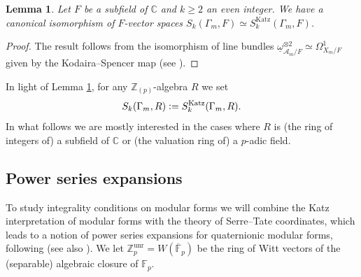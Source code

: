 \documentclass[a4paper,11pt]{amsart}
\numberwithin{equation}{section}
\theoremstyle{plain}
\newtheorem{lemma}[theorem]{Lemma}
\theoremstyle{definition}
\theoremstyle{remark}
\newcommand{\Z}{\mathbb{Z}}
\newcommand{\C}{\mathbb{C}}
\newcommand{\F}{\mathbb{F}}
\newcommand{\defeq}{\vcentcolon=}
\newcommand{\unr}{\mathrm{unr}}
\newcommand{\Katz}{\mathrm{Katz}}
\begin{document}
{\begin{lemma}\label{lemmamodfors} Let $F$ be a subfield of $\C$ and $k\geq 2$ an even integer. We have a canonical isomorphism  of $F$-vector spaces $S_k(\Gamma_m,F)\simeq S_k^\Katz(\Gamma_m,F)$.
\end{lemma}
\begin{proof} The result follows 
from the isomorphism of line bundles $\underline{\omega}_{\mathcal{A}_m/F}^{\otimes 2}\simeq \Omega_{X_m/F}^1$ given by the Kodaira--Spencer map (see \cite[Theorem 2.5]{Mori}). 
\end{proof}

In light of Lemma \ref{lemmamodfors}, for any $\Z_{(p)}$-algebra $R$ we set \[S_k(\Gamma_m,R)\defeq S_k^\Katz(\Gamma_m,R).\] In what follows we are mostly interested in the cases where $R$ is (the ring of integers of) a subfield of $\C$ or (the valuation ring of) a $p$-adic field.}

\subsection{Power series expansions}\label{sec-powerseriesexp}
To study integrality conditions on modular forms we will combine the Katz interpretation of modular forms with the theory of Serre--Tate coordinates, which leads to a notion of power series expansions for quaternionic modular forms, following \cite{Mori2, Mori, Mori1} (see also \cite{Brako, Brooks}). We let $\Z_p^\unr=W(\overline{\F}_p)$ be the ring of Witt vectors of the (separable) algebraic closure of $\F_p$.
\end{document}
